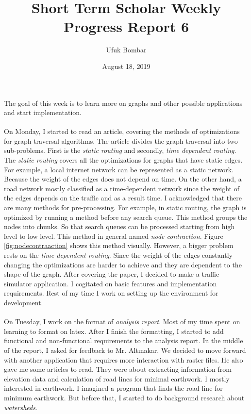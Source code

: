 \documentclass[a4paper]{article}
\title{Short Term Scholar Weekly Progress Report 6}
\author{Ufuk Bombar}
\date{August 18, 2019}
\begin{document}
    \maketitle{}
    The goal of this week is to learn more on graphs and other possible applications and start implementation.

    \paragraph{}
    On Monday, I started to read an article, covering the methods of optimizations for graph traversal algorithms\cite{graph}. The article divides the graph traversal into two sub-problems. First is the \textit{static routing} and secondly, \textit{time dependent routing}. The \textit{static routing} covers all the optimizations for graphs that have static edges. For example, a local internet network can be represented as a static network. Because the weight of the edges does not depend on time. On the other hand, a road network mostly classified as a time-dependent network since the weight of the edges depends on the traffic and as a result time. I acknowledged that there are many methods for pre-processing. For example, in static routing, the graph is optimized by running a method before any search queue. This method groups the nodes into chunks. So that search queues can be processed starting from high level to low level. This method in general named \textit{node contraction}. Figure \ref{fig:nodecontraaction} shows this method visually. However, a bigger problem rests on the \textit{time dependent routing}. Since the weight of the edges constantly changing the optimizations are harder to achieve and they are dependent to the shape of the graph. After covering the paper, I decided to make a traffic simulator application. I cogitated on basic features and implementation requirements. Rest of my time I work on setting up the environment for development.
    
    \paragraph{}
	On Tuesday, I work on the format of \textit{analysis report}. Most of my time spent on learning to format on latex. After I finish the formatting, I started to add functional and non-functional requirements to the analysis report. In the middle of the report, I asked for feedback to Mr. Altınakar. We decided to move forward with another application that requires more interaction with raster files. He also gave me some articles to read. They were about extracting information from elevation data\cite{ex1, ex4, ex5} and calculation of road lines for minimal earthwork\cite{earthwork}. I mostly interested in earthwork. I imagined a program that finds the road line for minimum earthwork. But before that, I started to do background research about \textit{watersheds}.
    
\end{document}

